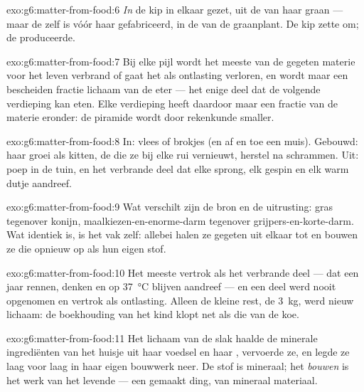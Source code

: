 \begin{solution}{exo:g6:matter-from-food:6}
\emph{In} de kip in elkaar gezet, uit de  van haar graan ---
maar de  zelf is vóór haar gefabriceerd, in de 
van de graanplant. De kip zette om; de  produceerde.
\end{solution}

\begin{solution}{exo:g6:matter-from-food:7}
Bij elke pijl wordt het meeste van de gegeten materie voor het leven
verbrand of gaat het als ontlasting verloren, en wordt maar een
bescheiden fractie lichaam van de eter --- het enige deel dat de volgende
verdieping kan eten. Elke verdieping heeft daardoor maar een fractie van
de materie eronder: de piramide wordt door rekenkunde smaller.
\end{solution}

\begin{solution}{exo:g6:matter-from-food:8}
In: vlees of brokjes (en af en toe een muis). Gebouwd: haar groei als
kitten, de  die ze bij elke rui vernieuwt, herstel na schrammen.
Uit: poep in de tuin, en het verbrande deel dat elke sprong, elk gespin
en elk warm dutje aandreef.
\end{solution}

\begin{solution}{exo:g6:matter-from-food:9}
Wat verschilt zijn de bron en de uitrusting: gras tegenover konijn,
maalkiezen-en-enorme-darm tegenover grijpers-en-korte-darm. Wat identiek
is, is het vak zelf: allebei halen ze gegeten  uit
elkaar tot  en bouwen ze die opnieuw op als hun eigen stof.
\end{solution}

\begin{solution}{exo:g6:matter-from-food:10}
Het meeste vertrok als het verbrande deel --- dat een jaar rennen, denken
en op \qty{37}{\degreeCelsius} blijven aandreef --- en een deel werd
nooit opgenomen en vertrok als ontlasting. Alleen de kleine rest, de
\qty{3}{kg}, werd nieuw lichaam: de boekhouding van het kind klopt net
als die van de koe.
\end{solution}

\begin{solution}{exo:g6:matter-from-food:11}
Het lichaam van de slak haalde de minerale ingrediënten van het huisje
uit haar voedsel en haar , vervoerde ze, en legde ze laag voor
laag in haar eigen bouwwerk neer. De stof is mineraal; het \emph{bouwen}
is het werk van het levende  --- een gemaakt ding, van mineraal
materiaal.
\end{solution}

